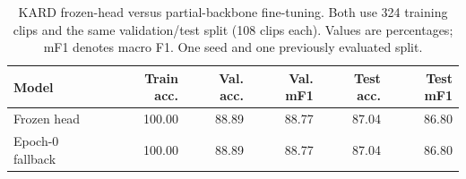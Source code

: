 \begin{table}[t]
\centering
\caption{KARD frozen-head versus partial-backbone fine-tuning. Both use 324 training clips and the same validation/test split (108 clips each). Values are percentages; mF1 denotes macro F1. One seed and one previously evaluated split.}
\label{tab:kard-upper-finetune}
\small
\begin{tabular}{lrrrrr}
\toprule
Model & Train acc. & Val. acc. & Val. mF1 & Test acc. & Test mF1 \\
\midrule
Frozen head & 100.00 & 88.89 & 88.77 & 87.04 & 86.80 \\
Epoch-0 fallback & 100.00 & 88.89 & 88.77 & 87.04 & 86.80 \\
\bottomrule
\end{tabular}
\end{table}